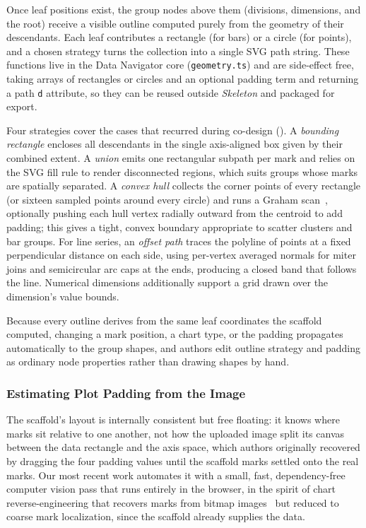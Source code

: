 \documentclass[12pt]{cmuthesis}
\begin{document}
Once leaf positions exist, the group nodes above them (divisions, dimensions, and the root) receive a visible outline computed purely from the geometry of their descendants. Each leaf contributes a rectangle (for bars) or a circle (for points), and a chosen strategy turns the collection into a single SVG path string. These functions live in the Data Navigator core (\texttt{geometry.ts}) and are side-effect free, taking arrays of rectangles or circles and an optional padding term and returning a path \texttt{d} attribute, so they can be reused outside \textit{Skeleton} and packaged for export.

Four strategies cover the cases that recurred during co-design (). A \textit{bounding rectangle} encloses all descendants in the single axis-aligned box given by their combined extent. A \textit{union} emits one rectangular subpath per mark and relies on the SVG fill rule to render disconnected regions, which suits groups whose marks are spatially separated. A \textit{convex hull} collects the corner points of every rectangle (or sixteen sampled points around every circle) and runs a Graham scan~\cite{Graham1972}, optionally pushing each hull vertex radially outward from the centroid to add padding; this gives a tight, convex boundary appropriate to scatter clusters and bar groups. For line series, an \textit{offset path} traces the polyline of points at a fixed perpendicular distance on each side, using per-vertex averaged normals for miter joins and semicircular arc caps at the ends, producing a closed band that follows the line. Numerical dimensions additionally support a grid drawn over the dimension's value bounds.

Because every outline derives from the same leaf coordinates the scaffold computed, changing a mark position, a chart type, or the padding propagates automatically to the group shapes, and authors edit outline strategy and padding as ordinary node properties rather than drawing shapes by hand.

\subsubsection{Estimating Plot Padding from the Image}

The scaffold's layout is internally consistent but free floating: it knows where marks sit relative to one another, not how the uploaded image split its canvas between the data rectangle and the axis space, which authors originally recovered by dragging the four padding values until the scaffold marks settled onto the real marks. Our most recent work automates it with a small, fast, dependency-free computer vision pass that runs entirely in the browser, in the spirit of chart reverse-engineering that recovers marks from bitmap images~\cite{Savva2011, Poco2017} but reduced to coarse mark localization, since the scaffold already supplies the data.
\end{document}
